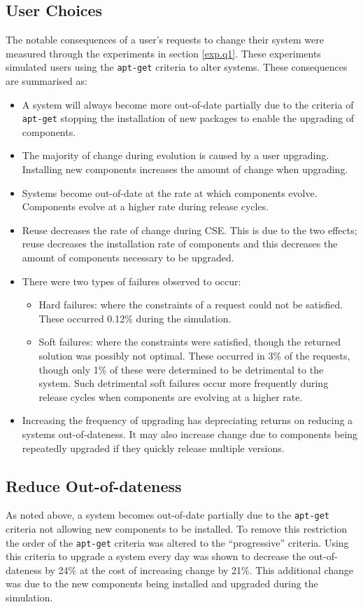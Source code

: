 \subsection{User Choices}
The notable consequences of a user's requests to change their system were measured through the experiments in section \ref{exp.q1}.
These experiments simulated users using the \texttt{apt-get} criteria  to alter systems.
These consequences are summarised as:
\begin{itemize}
	\item A system will always become more out-of-date partially due to the criteria of \texttt{apt-get} stopping the installation of new packages 
	to enable the upgrading of components.  
	\item The majority of change during evolution is caused by a user upgrading.
	Installing new components increases the amount of change when upgrading.
	\item Systems become out-of-date at the rate at which components evolve. Components evolve at a higher rate during release cycles.
	\item Reuse decreases the rate of change during CSE.
	This is due to the two effects; 
	reuse decreases the installation rate of components and this decreases the amount of components necessary to be upgraded.   
	\item There were two types of failures observed to occur:
		\begin{itemize}
  			\item Hard failures: where the constraints of a request could not be satisfied. These occurred 0.12\% during the simulation.
  			\item Soft failures: where the constraints were satisfied, though the returned solution was possibly not optimal.
  				These occurred in 3\% of the requests, though only 1\% of these were determined to be detrimental to the system.
  				Such detrimental soft failures occur more frequently during release cycles when components are evolving at a higher rate.
		\end{itemize}
	\item Increasing the frequency of upgrading has depreciating returns on reducing a systems out-of-dateness. 
	It may also increase change due to components being repeatedly upgraded if they quickly release multiple versions. 
\end{itemize}

\subsection{Reduce Out-of-dateness}
As noted above, a system becomes out-of-date partially due to the \texttt{apt-get} criteria not allowing new components to be installed.
To remove this restriction the order of the \texttt{apt-get} criteria was altered to the ``progressive'' criteria.
Using this criteria to upgrade a system every day was shown to decrease the out-of-dateness by 24\% at the cost of increasing change by 21\%.
This additional change was due to the new components being installed and upgraded during the simulation.

